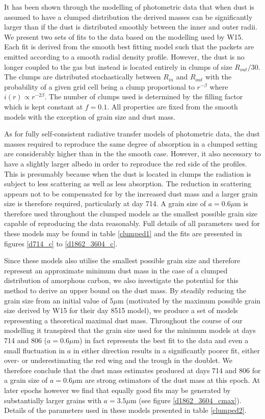 \documentclass[useAMS,usenatbib,usegraphicx]{mnras}
\begin{document}
It has been shown through the modelling of photometric data that when dust is assumed to have a clumped distribution the derived masses can be significantly larger than if the dust is distributed smoothly between the inner and outer radii.  We present two sets of fits to the data based on the modelling used by W15.  Each fit is derived from the smooth best fitting model such that the packets are emitted according to a smooth radial density profile.  However, the dust is no longer coupled to the gas but instead is located entirely in clumps of size $R_{out}/30$.  The clumps are distributed stochastically between $R_{in}$ and $R_{out}$ with the probability of a given grid cell being a clump proportional to $r^{- \beta }$ where $i(r) \propto r^{-2 \beta}$.  The number of clumps used is determined by the filling factor which is kept constant at $f=0.1$.  All properties are fixed from the smooth models with the exception of grain size and dust mass.

As for fully self-consistent radiative transfer models of photometric data, the dust masses required to reproduce the same degree of absorption in a clumped setting are considerably higher than in the the smooth case.  However, it also necessary to have a slightly larger albedo in order to reproduce the red side of the profiles.  This is presumably because when the dust is located in clumps the radiation is subject to less scattering as well as less absorption.  The reduction in scattering appears not to be compensated for by the increased dust mass and a larger grain size is therefore required, particularly at day 714.  A grain size of $a=0.6\mu$m is therefore used throughout the clumped models as the smallest possible grain size capable of reproducing the data reasonably. Full details of all parameters used for these models may be found in table \ref{clumped1} and the fits are presented in figures \ref{d714_c} to \ref{d1862_3604_c}.



Since these models also utilise the smallest possible grain size and therefore represent an approximate minimum dust mass in the case of a clumped distribution of amorphous carbon, we also investigate the potential for this method to derive an upper bound on the dust mass.  By steadily reducing the grain size from an initial value of 5$\mu$m (motivated by the maximum possible grain size derived by W15 for their day 8515 model), we produce a set of models representing a theoretical maximal dust mass.  Throughout the course of our modelling it transpired that the grain size used for the minimum models at days 714 and 806 ($a=0.6\mu$m) in fact represents the best fit to the data and even a small fluctuation in $a$ in either direction results in a significantly poorer fit, either over- or underestimating the red wing and the trough in the doublet.  We therefore conclude that the dust mass estimates produced at days 714 and 806 for a grain size of $a=0.6\mu$m are strong estimators of the dust mass at this epoch.  At later epochs however we find that equally good fits may be generated by substantially larger grains with $a=3.5\mu$m (see figure \ref{d1862_3604_cmax}).  Details of the parameters used in these models presented in table \ref{clumped2}. 
\end{document}
